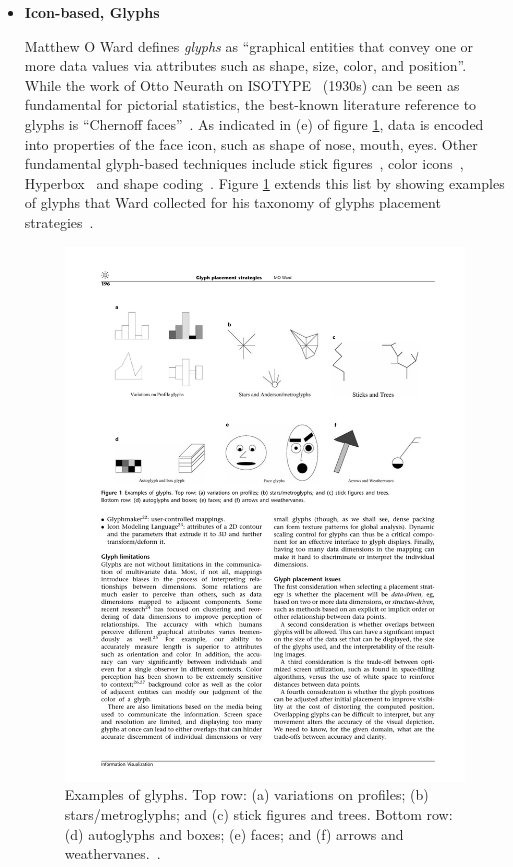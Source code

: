 \begin{itemize}

\item \textbf{Icon-based, Glyphs}

Matthew O Ward \cite{ward02glyphs} defines \textit{glyphs} as ``graphical entities that convey one or more data values via attributes such as shape, size, color, and position''. While the work of Otto Neurath on ISOTYPE~\cite{neurath} (1930s) can be seen as fundamental for pictorial statistics, the best-known literature reference to glyphs is ``Chernoff faces''~\cite{chernoff73}. As indicated in (e) of figure \ref{fig:glyphs-ward}, data is encoded into properties of the face icon, such as shape of nose, mouth, eyes. Other fundamental glyph-based techniques include stick figures~\cite{stickfigures}, color icons~\cite{coloricons}, Hyperbox~\cite{hyperbox} and shape coding~\cite{shapecoding}. Figure \ref{fig:glyphs-ward} extends this list by showing examples of glyphs that Ward collected for his taxonomy of glyphs placement strategies~\cite{ward02glyphs}.

\begin{figure}[h]
  \begin{center}
    \hspace*{-1cm}\includegraphics[width=1.2\textwidth]{figures/glyphs.pdf}
    \caption{Examples of glyphs. Top row: (a) variations on profiles; (b) stars/metroglyphs; and (c) stick figures and trees.
Bottom row: (d) autoglyphs and boxes; (e) faces; and (f) arrows and weathervanes.~\cite{ward02glyphs}.}
    \label{fig:glyphs-ward}
  \end{center}
\end{figure}


\end{itemize}
